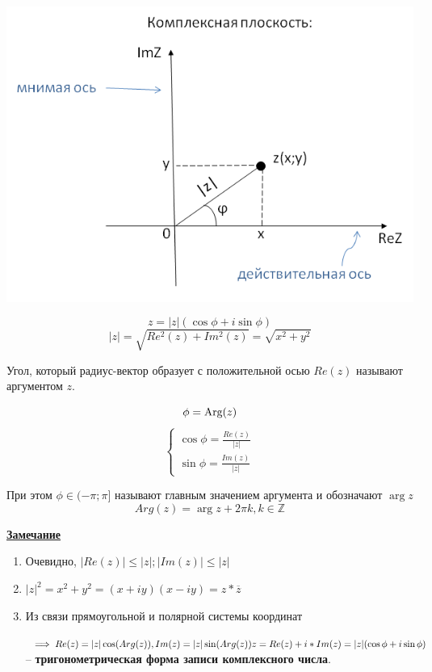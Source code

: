 \documentclass[a4paper,oneside]{article}
\newcommand{\parspace}{\vspace{10pt}}
\begin{document}
\includegraphics[scale=0.4]{complexplane1}

\[z = |z|(\cos \phi + i \sin \phi)\]
\[|z| = \sqrt{Re^2(z) + Im^2(z)} = \sqrt{x^2 + y^2}\]

Угол, который радиус-вектор образует с положительной осью $Re(z)$
называют аргументом $z$.

\[\phi = \textnormal{Arg}(z)\]
\[
    \begin{cases}
        \cos \phi = \frac{Re(z)}{|z|} \\
        \sin \phi = \frac{Im(z)}{|z|}
    \end{cases}
\]

При этом $\phi \in (-\pi; \pi]$ называют главным значением аргумента и обозначают $\arg z$
\[Arg(z) = \arg z + 2 \pi k, k \in \mathbb{Z}\]

\parspace

\underline{\textbf{Замечание}}

\begin{enumerate}
    \item Очевидно, $|Re(z)| \le |z|; |Im(z)| \le |z|$
    \item $|z|^2 = x^2 + y^2 = (x + iy)(x - iy) = z * \overline{z}$
    \item Из связи прямоугольной и полярной системы координат 
    
    $\implies Re(z) = |z| \cos (Arg(z)), Im(z) = |z| \sin (Arg(z)) \\
    z = Re(z) + i*Im(z) = |z|(\cos \phi + i \sin \phi)$ -- \textbf{тригонометрическая
    форма записи комплексного числа}.
\end{enumerate}
\end{document}
